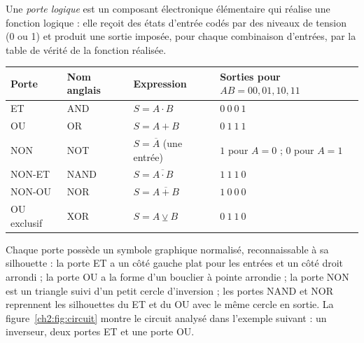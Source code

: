 \begin{definition}
Une \emph{porte logique} est un composant électronique élémentaire qui réalise une fonction logique : elle reçoit des états d'entrée codés par des niveaux de tension (0 ou 1) et produit une sortie imposée, pour chaque combinaison d'entrées, par la table de vérité de la fonction réalisée.
\end{definition}

\begin{center}
\small
\begin{tabular}{L{2.1cm}L{1.9cm}L{3.6cm}L{7.0cm}}
\toprule
{}\textbf{Porte} & \textbf{Nom anglais} & \textbf{Expression} & \textbf{Sorties pour $AB = 00, 01, 10, 11$}\\
\midrule
ET & AND & $S = A \cdot B$ & $0\ 0\ 0\ 1$\\
OU & OR & $S = A + B$ & $0\ 1\ 1\ 1$\\
NON & NOT & $S = \overline{A}$ (une entrée) & $1$ pour $A = 0$ ; $0$ pour $A = 1$\\
NON-ET & NAND & $S = \overline{A \cdot B}$ & $1\ 1\ 1\ 0$\\
NON-OU & NOR & $S = \overline{A + B}$ & $1\ 0\ 0\ 0$\\
OU exclusif & XOR & $S = A \veebar B$ & $0\ 1\ 1\ 0$\\
\bottomrule
\end{tabular}
\label{ch2:tab:portes}
\end{center}

Chaque porte possède un symbole graphique normalisé, reconnaissable à sa silhouette : la porte ET a un côté gauche plat pour les entrées et un côté droit arrondi ; la porte OU a la forme d'un bouclier à pointe arrondie ; la porte NON est un triangle suivi d'un petit cercle d'inversion ; les portes NAND et NOR reprennent les silhouettes du ET et du OU avec le même cercle en sortie. La figure~\ref{ch2:fig:circuit} montre le circuit analysé dans l'exemple suivant : un inverseur, deux portes ET et une porte OU.

